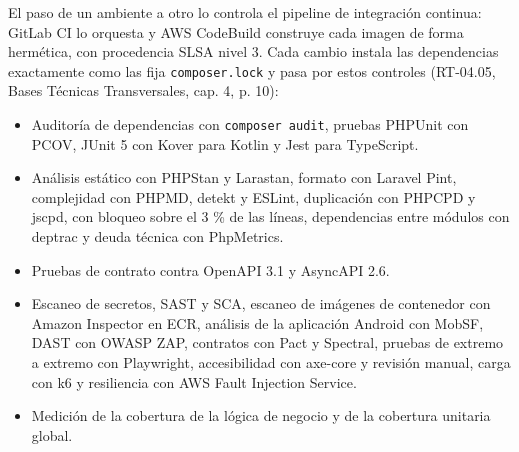 El paso de un ambiente a otro lo controla el pipeline de integración continua: GitLab CI lo orquesta y AWS CodeBuild construye cada imagen de forma hermética, con procedencia SLSA nivel 3. Cada cambio instala las dependencias exactamente como las fija \texttt{composer.lock} y pasa por estos controles (RT-04.05, Bases Técnicas Transversales, cap. 4, p. 10):

\begin{itemize}
  \item Auditoría de dependencias con \texttt{composer audit}, pruebas PHPUnit con PCOV, JUnit 5 con Kover para Kotlin y Jest para TypeScript.
\item Análisis estático con PHPStan y Larastan, formato con Laravel Pint, complejidad con PHPMD, detekt y ESLint, duplicación con PHPCPD y jscpd, con bloqueo sobre el 3 \% de las líneas, dependencias entre módulos con deptrac y deuda técnica con PhpMetrics.
  \item Pruebas de contrato contra OpenAPI 3.1 y AsyncAPI 2.6.
\item Escaneo de secretos, SAST y SCA, escaneo de imágenes de contenedor con Amazon Inspector en ECR, análisis de la aplicación Android con MobSF, DAST con OWASP ZAP, contratos con Pact y Spectral, pruebas de extremo a extremo con Playwright, accesibilidad con axe-core y revisión manual, carga con k6 y resiliencia con AWS Fault Injection Service.
  \item Medición de la cobertura de la lógica de negocio y de la cobertura unitaria global.
\end{itemize}

